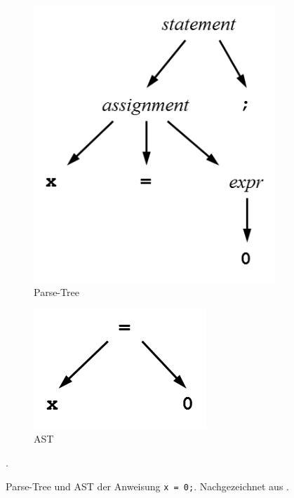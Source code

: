 \begin{figure}[H]
        \begin{subfigure}[b]{0.45\textwidth}
        	\centering
            \includegraphics[width=\textwidth]{images/kapitel4/parseTreeGraph.png}
            \caption{Parse-Tree}
            \label{fig:bsp_disp_l}
        \end{subfigure}
        \begin{subfigure}[b]{0.30\textwidth}
            \centering
            \includegraphics[width=\textwidth]{images/kapitel4/astGraph.png}
            \caption{AST}
            \label{fig:bsp_disp_r}
        \end{subfigure}
        \caption{Parse-Tree und AST der Anweisung \texttt{x = 0;}. Nachgezeichnet aus \cite{book:parrLang}.}.
	    \label{fig:Beispiel_Disparitätsbild}
\end{figure}

